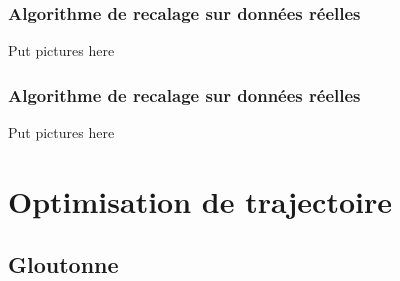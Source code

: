 \documentclass[11pt]{beamer}
\begin{document}

\begin{frame}

\frametitle{Algorithme de recalage sur données réelles}

Put pictures here

\end{frame}





\begin{frame}

\frametitle{Algorithme de recalage sur données réelles}

Put pictures here

\end{frame}

\section{Optimisation de trajectoire}
\subsection{Gloutonne}
\end{document}
